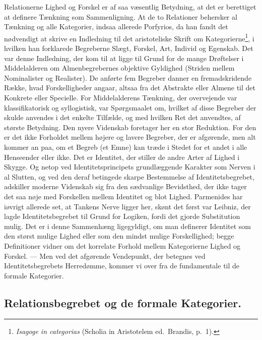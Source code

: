 \documentclass[12pt]{article}
\newcommand{\opage}[1]{\marginnote{\footnotesize\textit{[#1]}}}
\begin{document}
Relationerne Lighed og Forskel er af saa væsentlig Betydning,
at det er berettiget at definere Tænkning som
Sammenligning. At de to Relationer behersker al Tænkning
og alle Kategorier, indsaa allerede Porfyrios, da han
fandt det nødvendigt at skrive en Indledning til det aristoteliske
Skrift om Kategorierne\footnote{\textit{Isagoge in categorias}
(Scholia in Aristotelem ed.\ Brandis, p.~1).}, i hvilken han forklarede
Begreberne Slægt, Forskel, Art, Individ og Egenskab. Det
var denne \guillemotright Indledning\guillemotleft, der kom til at ligge til Grund for
de mange Drøftelser i Middelalderen om Almenbegrebernes
objektive Gyldighed (Striden mellem Nominalister og Realister).
De anførte fem Begreber danner en fremadskridende
Række, hvad Forskelligheder angaar, altsaa fra det Abstrakte
eller Almene til det Konkrete eller Specielle. For
Middelalderens Tænkning, der overvejende var klassifikatorisk
og syllogistisk, var Spørgsmaalet om, hvilket af disse
\opage{33} Begreber der skulde anvendes i det enkelte Tilfælde, og
med hvilken Ret det anvendtes, af største Betydning. Den
nyere Videnskab foretager her en stor Reduktion. For den
er det ikke Forholdet mellem højere og lavere Begreber,
der er afgørende, men alt kommer an paa, om et Begreb
(et Emne) kan træde i Stedet for et andet i alle Henseender
eller ikke. Det er Identitet, der stiller de andre Arter
af Lighed i Skygge. Og netop ved Identitetsprincipets grundlæggende
Karakter som Nerven i al Slutten, og ved den
deraf betingede skarpe Bestemmelse af Identitetsbegrebet,
adskiller moderne Videnskab sig fra den sædvanlige Bevidsthed,
der ikke tager det saa nøje med Forskellen mellem
Identitet og blot Lighed. Parmenides har iøvrigt allerede
set, at Tankens Nerve ligger her, skønt det først var
Leibniz, der lagde Identitetsbegrebet til Grund for Logiken,
fordi det gjorde Substitution mulig. Det er i denne Sammenhæng
ligegyldigt, om man definerer Identitet som den
størst mulige Lighed eller som den mindst mulige Forskellighed;
begge Definitioner vidner om det korrelate Forhold
mellem Kategorierne Lighed og Forskel. --- Men ved
det afgørende Vendepunkt, der betegnes ved Identitetsbegrebets
Herredømme, kommer vi over fra de fundamentale
til de formale Kategorier.

\subsection{Relationsbegrebet og de formale Kategorier.}\label{sec:3b}
\end{document}
